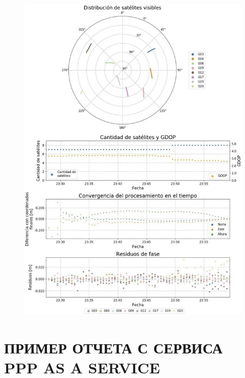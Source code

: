 \begin{figure}[hp]
	\centering
	\includegraphics[width=\linewidth]{images/picB03}
\end{figure}




\chapter{ПРИМЕР ОТЧЕТА С СЕРВИСА PPP AS A SERVICE}\label{app:C}


